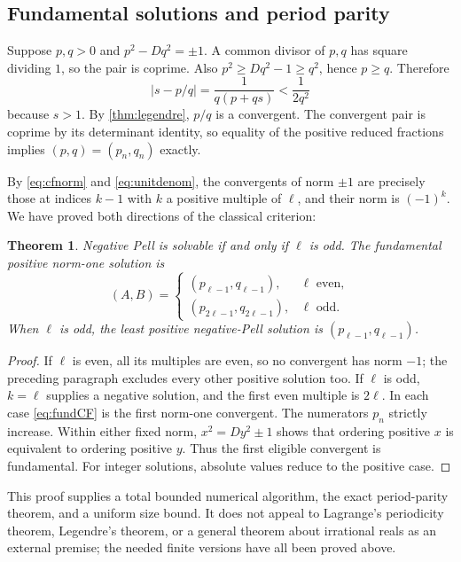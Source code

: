 \documentclass[11pt,letterpaper]{article}
\newtheorem{theorem}{Theorem}[section]
\theoremstyle{definition}
\newcommand{\abs}[1]{\lvert#1\rvert}
\begin{document}
\subsection{Fundamental solutions and period parity}\label{sec:cfclassification}

Suppose $p,q>0$ and $p^2-Dq^2=\pm1$. A common divisor of $p,q$ has
square dividing $1$, so the pair is coprime. Also
$p^2\ge Dq^2-1\ge q^2$, hence $p\ge q$. Therefore
\[
 \abs{s-p/q}=\frac1{q(p+qs)}<\frac1{2q^2}
\]
because $s>1$. By \cref{thm:legendre}, $p/q$ is a convergent.
The convergent pair is coprime by its determinant identity, so equality of
the positive reduced fractions implies $(p,q)=(p_n,q_n)$ exactly.

By \eqref{eq:cfnorm} and \eqref{eq:unitdenom}, the convergents of norm
$\pm1$ are precisely those at indices $k-1$ with $k$ a positive multiple
of $\ell$, and their norm is $(-1)^k$. We have proved both directions of
the classical criterion:
\begin{theorem}\label{thm:parity}
Negative Pell is solvable if and only if $\ell$ is odd. The fundamental
positive norm-one solution is
\begin{equation}\label{eq:fundCF}
 (A,B)=
 \begin{cases}
 (p_{\ell-1},q_{\ell-1}),&\ell\text{ even},\\
 (p_{2\ell-1},q_{2\ell-1}),&\ell\text{ odd}.
 \end{cases}
\end{equation}
When $\ell$ is odd, the least positive negative-Pell solution is
$(p_{\ell-1},q_{\ell-1})$.
\end{theorem}
\begin{proof}
If $\ell$ is even, all its multiples are even, so no convergent has norm
$-1$; the preceding paragraph excludes every other positive solution too.
If $\ell$ is odd, $k=\ell$ supplies a negative solution, and the first
even multiple is $2\ell$. In each case \eqref{eq:fundCF} is the first
norm-one convergent. The numerators $p_n$ strictly increase. Within either
fixed norm, $x^2=Dy^2\pm1$ shows that ordering positive $x$ is equivalent
to ordering positive $y$. Thus the first eligible convergent is fundamental.
For integer solutions, absolute values reduce to the positive case.
\end{proof}

This proof supplies a total bounded numerical algorithm, the exact
period-parity theorem, and a uniform size bound. It does not appeal to
Lagrange's periodicity theorem, Legendre's theorem, or a general theorem
about irrational reals as an external premise; the needed finite versions
have all been proved above.
\end{document}

